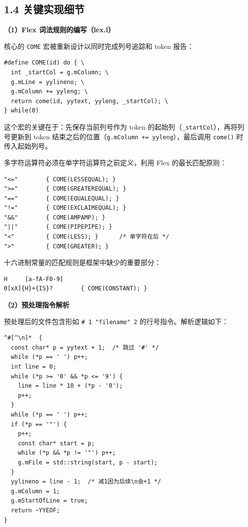 \documentclass[12pt,a4paper]{article}
\begin{document}
\subsection{1.4 关键实现细节}

\textbf{（1）Flex 词法规则的编写（lex.l）}

核心的 \texttt{COME} 宏被重新设计以同时完成列号追踪和 token 报告：

\begin{lstlisting}[style=flexstyle]
#define COME(id) do { \
  int _startCol = g.mColumn; \
  g.mLine = yylineno; \
  g.mColumn += yyleng; \
  return come(id, yytext, yyleng, _startCol); \
} while(0)
\end{lstlisting}

这个宏的关键在于：先保存当前列号作为 token 的起始列（\texttt{\_startCol}），再将列号更新到 token 结束之后的位置（\texttt{g.mColumn += yyleng}），最后调用 \texttt{come()} 时传入起始列号。

多字符运算符必须在单字符运算符之前定义，利用 Flex 的最长匹配原则：

\begin{lstlisting}[style=flexstyle]
"<="        { COME(LESSEQUAL); }
">="        { COME(GREATEREQUAL); }
"=="        { COME(EQUALEQUAL); }
"!="        { COME(EXCLAIMEQUAL); }
"&&"        { COME(AMPAMP); }
"||"        { COME(PIPEPIPE); }
"<"         { COME(LESS); }      /* 单字符在后 */
">"         { COME(GREATER); }
\end{lstlisting}

十六进制常量的匹配规则是框架中缺少的重要部分：
\begin{lstlisting}[style=flexstyle]
H     [a-fA-F0-9]
0[xX]{H}+{IS}?        { COME(CONSTANT); }
\end{lstlisting}

\textbf{（2）预处理指令解析}

预处理后的文件包含形如 \texttt{\# 1 "filename" 2} 的行号指令。解析逻辑如下：

\begin{lstlisting}[style=flexstyle]
^#[^\n]*  {
  const char* p = yytext + 1;  /* 跳过 '#' */
  while (*p == ' ') p++;
  int line = 0;
  while (*p >= '0' && *p <= '9') {
    line = line * 10 + (*p - '0');
    p++;
  }
  while (*p == ' ') p++;
  if (*p == '"') {
    p++;
    const char* start = p;
    while (*p && *p != '"') p++;
    g.mFile = std::string(start, p - start);
  }
  yylineno = line - 1;  /* 减1因为后续\n会+1 */
  g.mColumn = 1;
  g.mStartOfLine = true;
  return ~YYEOF;
}
\end{lstlisting}
\end{document}
